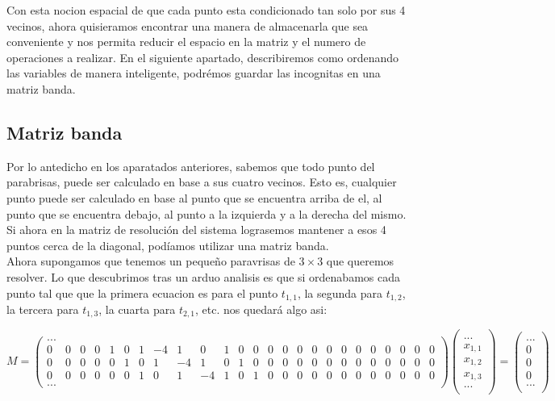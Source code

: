 Con esta nocion espacial de que cada punto esta condicionado tan solo por sus 4 vecinos, ahora quisieramos encontrar una manera de almacenarla que sea conveniente y nos permita reducir el espacio en la matriz y el numero de operaciones a realizar. En el siguiente apartado, describiremos como ordenando las variables de manera inteligente, podrémos guardar las incognitas en una matriz banda.

\subsection{Matriz banda}

Por lo antedicho en los aparatados anteriores, sabemos que todo punto del parabrisas, puede ser calculado en base a sus cuatro vecinos. Esto es, cualquier punto puede ser calculado en base al punto que se encuentra arriba de el, al punto que se encuentra debajo, al punto a la izquierda y a la derecha del mismo. Si ahora en la matriz de resolución del sistema lograsemos mantener a esos 4 puntos cerca de la diagonal, podíamos utilizar una matriz banda.
\\
Ahora supongamos que tenemos un pequeño paravrisas de $3 \times 3$ que queremos resolver. Lo que descubrimos tras un arduo analisis es que si ordenabamos cada punto tal que que la primera ecuacion es para el punto $t_{1,1}$, la segunda para $t_{1,2}$, la tercera para $t_{1,3}$, la cuarta para $t_{2,1}$, etc. nos quedará algo asi:

\setcounter{MaxMatrixCols}{30}

\[
M = \begin{pmatrix}
... \\
 0 & 0 & 0 & 0 & 1 & 0 & 1 & -4 & 1 & 0 & 1 & 0 & 0 & 0 & 0 & 0 & 0 & 0 & 0 & 0 & 0 & 0 & 0 & 0 & 0 \\
 0 & 0 & 0 & 0 & 0 & 1 & 0 & 1 & -4 & 1 & 0 & 1 & 0 & 0 & 0 & 0 & 0 & 0 & 0 & 0 & 0 & 0 & 0 & 0 & 0 \\
 0 & 0 & 0 & 0 & 0 & 0 & 1 & 0 & 1 & -4 & 1 & 0 & 1 & 0 & 0 & 0 & 0 & 0 & 0 & 0 & 0 & 0 & 0 & 0 & 0 \\
...
\end{pmatrix}
\begin{pmatrix} \\... \\ x_{1,1} \\ x_{1,2} \\ x_{1,3} \\ ... \\ \end{pmatrix}
=
\begin{pmatrix}  \\ ... \\ 0 \\ 0 \\ 0 \\ ... \\ \end{pmatrix}
\]

